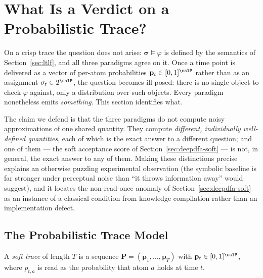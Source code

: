 \section{What Is a Verdict on a Probabilistic Trace?}
\label{sec:prob-verdict}

On a crisp trace the question does not arise: $\boldsymbol{\sigma} \models \varphi$ is defined by the semantics of Section~\ref{sec:ltlf}, and all three paradigms agree on it. Once a time point is delivered as a vector of per-atom probabilities $\mathbf{p}_t \in [0,1]^{\calP}$ rather than as an assignment $\sigma_t \in 2^\calP$, the question becomes ill-posed: there is no single object to check $\varphi$ against, only a distribution over such objects. Every paradigm nonetheless emits \emph{something}. This section identifies what.

The claim we defend is that the three paradigms do not compute noisy approximations of one shared quantity. They compute \emph{different, individually well-defined quantities}, each of which is the exact answer to a different question; and one of them --- the soft acceptance score of Section~\ref{sec:deepdfa-soft} --- is not, in general, the exact answer to any of them. Making these distinctions precise explains an otherwise puzzling experimental observation (the symbolic baseline is far stronger under perceptual noise than ``it throws information away'' would suggest), and it locates the non-read-once anomaly of Section~\ref{sec:deepdfa-soft} as an instance of a classical condition from knowledge compilation rather than an implementation defect.

\subsection{The Probabilistic Trace Model}
\label{sec:prob-model}

\begin{definition}
\label{def:soft-trace}
A \emph{soft trace} of length $T$ is a sequence $\mathbf{P} = (\mathbf{p}_1, \dots, \mathbf{p}_T)$ with $\mathbf{p}_t \in [0,1]^{\calP}$, where $p_{t,a}$ is read as the probability that atom $a$ holds at time $t$.
\end{definition}

